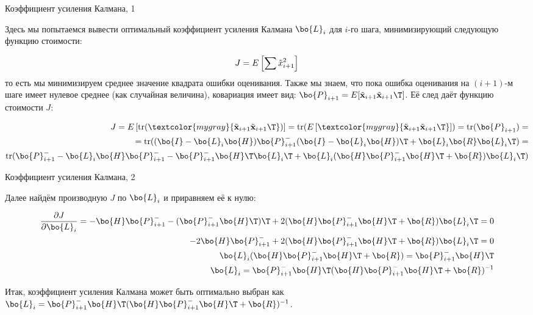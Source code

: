 \documentclass{beamer}
\newcommand{\btil}[1] {\Tilde{\mathbf{#1}}}
\begin{document}
\begin{frame}{Коэффициент усиления Калмана, 1}
	\begin{flushleft}
		
		Здесь мы попытаемся вывести оптимальный коэффициент усиления Калмана $\bo{L}_i$ для $i$-го шага, минимизирующий следующую функцию стоимости:
		
		\begin{equation}
			J = E \left[ \sum \Tilde x_{i+1}^2  \right]
		\end{equation}
		то есть мы минимизируем среднее значение квадрата ошибки оценивания. Также мы знаем, что пока ошибка оценивания на $(i+1)$-м шаге имеет нулевое среднее (как случайная величина), ковариация имеет вид: $\bo{P}_{i+1} = E [ \btil{x}_{i+1} \btil{x}_{i+1}\T ]$. Её след даёт функцию стоимости $J$:
		
		
		
		\begin{align*}
			J = E \left[ \text{tr}(\textcolor{mygray}{
				\btil{x}_{i+1} \btil{x}_{i+1}\T})  \right] =
			\text{tr} (E \left[ \textcolor{mygray}{
				\btil{x}_{i+1} \btil{x}_{i+1}\T}  \right]) = 
			\text{tr} (\bo{P}_{i+1} ) =
			\\
			= \text{tr}(
			(\bo{I} - \bo{L}_i \bo{H}) \bo{P}_{i+1}^- (\bo{I} - \bo{L}_i \bo{H})\T +\bo{L}_i\bo{R}\bo{L}_i\T
			) = \\
			\text{tr}(
			\bo{P}_{i+1}^- - \bo{L}_i \bo{H} \bo{P}_{i+1}^- 
			- \bo{P}_{i+1}^- \bo{H}\T \bo{L}_i\T
			+ \bo{L}_i (\bo{H}\bo{P}_{i+1}^- \bo{H}\T + \bo{R}) \bo{L}_i\T
			)
		\end{align*}		
		
		
	\end{flushleft}
\end{frame}



\begin{frame}{Коэффициент усиления Калмана, 2}
	\begin{flushleft}
		
		Далее найдём производную $J$ по $\bo{L}_i$ и приравняем её к нулю:
		
		\begin{align*}
			\frac{\partial J}{\partial \bo{L}_i} 
			= 
			-\bo{H} \bo{P}_{i+1}^- -(\bo{P}_{i+1}^- \bo{H}\T)\T + 
			2(\bo{H}\bo{P}_{i+1}^- \bo{H}\T + \bo{R}) \bo{L}_i\T = 0
			\\
			-2 \bo{H} \bo{P}_{i+1}^- + 2(\bo{H}\bo{P}_{i+1}^- \bo{H}\T + \bo{R}) \bo{L}_i\T = 0
			\\
			\bo{L}_i (\bo{H}\bo{P}_{i+1}^- \bo{H}\T + \bo{R}) = \bo{P}_{i+1}^- \bo{H}\T
			\\
			\bo{L}_i = \bo{P}_{i+1}^- \bo{H}\T (\bo{H}\bo{P}_{i+1}^- \bo{H}\T + \bo{R})^{-1}
		\end{align*}		
		
		
		Итак, коэффициент усиления Калмана может быть оптимально выбран как $\bo{L}_i = \bo{P}_{i+1}^- \bo{H}\T (\bo{H}\bo{P}_{i+1}^- \bo{H}\T + \bo{R})^{-1}$.
		
	\end{flushleft}
\end{frame}
\end{document}
